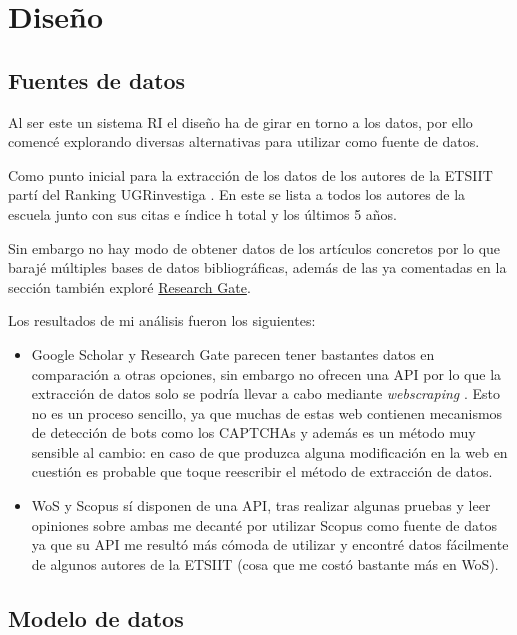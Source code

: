 \chapter{Diseño}


\section{Fuentes de datos}
Al ser este un sistema \acrshort{RI} el diseño ha de girar en torno a los datos, por ello comencé explorando diversas alternativas para utilizar como fuente de datos. 

Como punto inicial para la extracción de los datos de los autores de la \acrshort{ETSIIT} partí del Ranking UGRinvestiga \cite{Ranking_UGRInvestiga}. En este se lista a todos los autores de la escuela junto con sus citas e índice h total y los últimos 5 años.

Sin embargo no hay modo de obtener datos de los artículos concretos por lo que barajé múltiples bases de datos bibliográficas, además de las ya comentadas en la sección  también exploré \href{https://www.researchgate.net/}{Research Gate}.

Los resultados de mi análisis fueron los siguientes: 
\label{ls:dataSourceAnalisis}
\begin{itemize}
	
	\item Google Scholar y Research Gate parecen tener bastantes datos en comparación a otras opciones, sin embargo no ofrecen una \acrshort{API} por lo que la extracción de datos solo se podría llevar a cabo mediante \textit{\gls{webscraping}} . Esto no es un proceso sencillo, ya que muchas de estas web contienen mecanismos de detección de bots como los CAPTCHAs \cite{scrapping_GS} y además es un método muy sensible al cambio: en caso de que produzca alguna modificación en la web en cuestión es probable que toque reescribir el método de extracción de datos.
	\item \acrshort{WoS} y Scopus sí disponen de una \acrshort{API}, tras realizar algunas pruebas y leer opiniones sobre ambas me decanté por utilizar Scopus como fuente de datos ya que su \acrshort{API} me resultó más cómoda de utilizar y encontré datos fácilmente de algunos autores de la \acrshort{ETSIIT} (cosa que me costó bastante más en \acrshort{WoS}).
\end{itemize}

\section{Modelo de datos}

